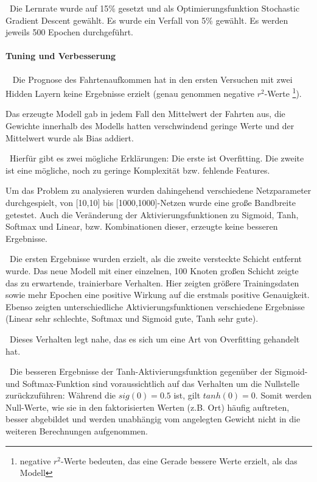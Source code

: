 ~\newline Die Lernrate wurde auf 15\% gesetzt und als Optimierungsfunktion Stochastic Gradient Descent gewählt. Es wurde ein Verfall von 5\% gewählt. Es werden jeweils 500 Epochen durchgeführt. 
\paragraph{Tuning und Verbesserung} ~\newline
Die Prognose des Fahrtenaufkommen hat in den ersten Versuchen mit zwei Hidden Layern keine Ergebnisse erzielt (genau genommen negative $r^2$-Werte \footnote{negative $r^2$-Werte bedeuten, das eine Gerade bessere Werte erzielt, als das Modell}). 

Das erzeugte Modell gab in jedem Fall den Mittelwert der Fahrten aus, die Gewichte innerhalb des Modells hatten verschwindend geringe Werte und der Mittelwert wurde als Bias addiert. 


~\newline Hierfür gibt es zwei mögliche Erklärungen: Die erste ist Overfitting. Die zweite ist eine mögliche, noch zu geringe Komplexität bzw. fehlende Features. 

Um das Problem zu analysieren wurden dahingehend verschiedene Netzparameter durchgespielt, von [10,10] bis [1000,1000]-Netzen wurde eine große Bandbreite getestet. Auch die Veränderung der Aktivierungsfunktionen zu Sigmoid, Tanh, Softmax und Linear, bzw. Kombinationen dieser, erzeugte keine besseren Ergebnisse. 

~\newline Die ersten Ergebnisse wurden erzielt, als die zweite versteckte Schicht entfernt wurde. Das neue Modell mit einer einzelnen, 100 Knoten großen Schicht zeigte das zu erwartende, trainierbare Verhalten. Hier zeigten größere Trainingsdaten sowie mehr Epochen eine positive Wirkung auf die erstmals positive Genauigkeit. Ebenso zeigten unterschiedliche Aktivierungsfunktionen verschiedene Ergebnisse (Linear sehr schlechte, Softmax und Sigmoid gute, Tanh sehr gute). 

~\newline Dieses Verhalten legt nahe, das es sich um eine Art von Overfitting gehandelt hat. 

~\newline Die besseren Ergebnisse der Tanh-Aktivierungsfunktion gegenüber der Sigmoid- und Softmax-Funktion sind voraussichtlich auf das Verhalten um die Nullstelle zurückzuführen: Während die $sig(0)=0.5$ ist, gilt $tanh(0)=0$. Somit werden Null-Werte, wie sie in den faktorisierten Werten (z.B. Ort) häufig auftreten, besser abgebildet und werden unabhängig vom angelegten Gewicht nicht in die weiteren Berechnungen aufgenommen. 

